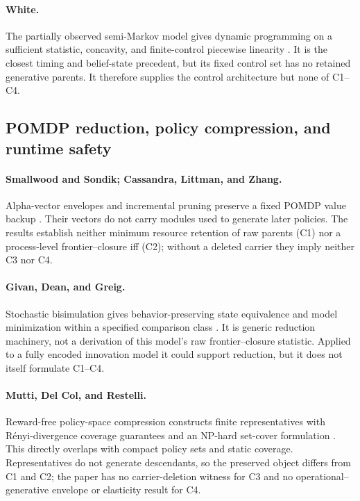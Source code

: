 \paragraph{White.}
The partially observed semi-Markov model gives dynamic programming on a
sufficient statistic, concavity, and finite-control piecewise linearity
\cite{White1976}.  It is the closest timing and belief-state precedent, but
its fixed control set has no retained generative parents.  It therefore
supplies the control architecture but none of C1--C4.

\subsection{POMDP reduction, policy compression, and runtime safety}

\paragraph{Smallwood and Sondik; Cassandra, Littman, and Zhang.}
Alpha-vector envelopes and incremental pruning preserve a fixed POMDP value
backup \cite{SmallwoodSondik1973,CassandraLittmanZhang1997}.  Their vectors do
not carry modules used to generate later policies.  The results establish
neither minimum resource retention of raw parents (C1) nor a process-level
frontier--closure iff (C2); without a deleted carrier they imply neither C3
nor C4.

\paragraph{Givan, Dean, and Greig.}
Stochastic bisimulation gives behavior-preserving state equivalence and model
minimization within a specified comparison class \cite{GivanDeanGreig2003}.
It is generic reduction machinery, not a derivation of this model's raw
frontier--closure statistic.  Applied to a fully encoded innovation model it
could support reduction, but it does not itself formulate C1--C4.

\paragraph{Mutti, Del Col, and Restelli.}
Reward-free policy-space compression constructs finite representatives with
R\'enyi-divergence coverage guarantees and an NP-hard set-cover formulation
\cite{MuttiDelColRestelli2022}.  This directly overlaps with compact policy
sets and static coverage.  Representatives do not generate descendants, so
the preserved object differs from C1 and C2; the paper has no
carrier-deletion witness for C3 and no operational--generative envelope or
elasticity result for C4.

